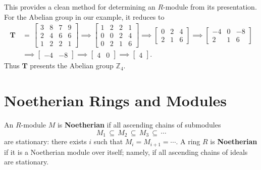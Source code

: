 \documentclass[11pt]{article}
\newcommand{\mat}[1]{\mathbf{#1}}
\begin{document}
This provides a clean method for determining an $R$-module from its presentation. For the Abelian group in our example, it reduces to
\begin{align*}
  \mat{T} \, & = \, \begin{bmatrix} 3 & 8 & 7 & 9 \\ 2 & 4 & 6 & 6 \\ 1 & 2 & 2 & 1 \end{bmatrix} \implies \begin{bmatrix} 1 & 2 & 2 & 1 \\ 0 & 0 & 2 & 4 \\ 0 & 2 & 1 & 6 \end{bmatrix} \implies \begin{bmatrix} 0 & 2 & 4 \\ 2 & 1 & 6 \end{bmatrix} \implies \begin{bmatrix} -4 & 0 & -8 \\ 2 & 1 & 6 \end{bmatrix} \\
             & \implies \begin{bmatrix} -4 & -8 \end{bmatrix} \implies \begin{bmatrix} 4 & 0 \end{bmatrix} \implies \begin{bmatrix} 4 \end{bmatrix}.
\end{align*}
Thus $\mat{T}$ presents the Abelian group $\mathbb{Z}_{4}$.


\section{Noetherian Rings and Modules}

An $R$-module $M$ is \textbf{Noetherian} if all ascending chains of submodules
\[
  M_{1} \, \subseteq \, M_{2} \, \subseteq \, M_{3} \, \subseteq \, \cdots
\]
are stationary: there exists $i$ such that $M_{i} = M_{i + 1} = \cdots$. A ring $R$ is \textbf{Noetherian} if it is a Noetherian module over itself; namely, if all ascending chains of ideals are stationary.
\end{document}
